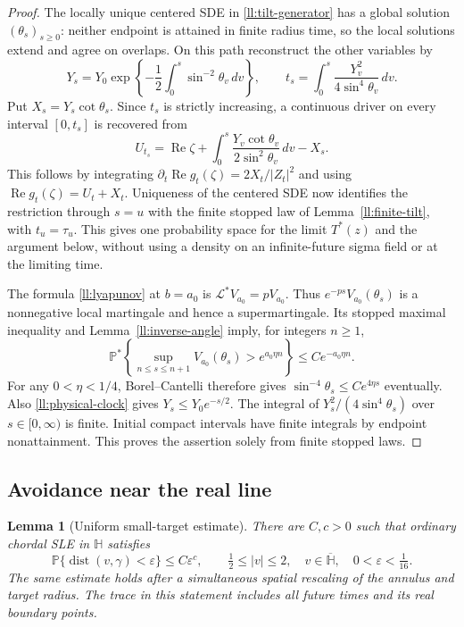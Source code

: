 \documentclass[11pt]{article}
\newtheorem{lemma}[theorem]{Lemma}
\theoremstyle{definition}
\theoremstyle{remark}
\numberwithin{equation}{section}
\begin{document}
\begin{proof}
The locally unique centered SDE in \eqref{ll:tilt-generator} has a global
solution $(\theta_s)_{s\ge0}$: neither endpoint is attained in finite
radius time, so the local solutions extend and agree on overlaps.
On this path reconstruct the other variables by
\[
 Y_s=Y_0\exp\left\{-\frac12\int_0^s\sin^{-2}\theta_v\,dv\right\},
 \qquad
 t_s=\int_0^s\frac{Y_v^2}{4\sin^4\theta_v}\,dv.
\]
Put $X_s=Y_s\cot\theta_s$.  Since $t_s$ is strictly increasing, a
continuous driver on every interval $[0,t_s]$ is recovered from
\[
 U_{t_s}=\operatorname{Re}\zeta+
       \int_0^s\frac{Y_v\cot\theta_v}{2\sin^2\theta_v}\,dv-X_s.
\]
This follows by integrating $\partial_t\operatorname{Re}g_t(\zeta)
=2X_t/|Z_t|^2$ and using $\operatorname{Re}g_t(\zeta)=U_t+X_t$.
Uniqueness of the centered SDE now identifies the restriction through
$s=u$ with the finite stopped law of Lemma~\ref{ll:finite-tilt}, with
$t_u=\tau_u$. This gives one probability space for the limit $T^*(z)$
and the argument below, without using a
density on an infinite-future sigma field or at the limiting time.

The formula \eqref{ll:lyapunov} at $b=a_0$ is
$\mathcal L^*V_{a_0}=pV_{a_0}$.
Thus $e^{-ps}V_{a_0}(\theta_s)$ is a nonnegative local martingale
and hence a supermartingale. Its stopped maximal inequality and
Lemma~\ref{ll:inverse-angle} imply, for integers $n\ge1$,
\[
 \mathbb P^*\left\{\sup_{n\le s\le n+1}
       V_{a_0}(\theta_s)>e^{a_0\eta n}\right\}
       \le C e^{-a_0\eta n}.
\]
For any $0<\eta<1/4$, Borel--Cantelli therefore gives
$\sin^{-4}\theta_s\le C e^{4\eta s}$ eventually.
Also \eqref{ll:physical-clock} gives $Y_s\le Y_0e^{-s/2}$.
The integral of $Y_s^2/(4\sin^4\theta_s)$ over $s\in[0,\infty)$
is finite. Initial compact intervals have finite integrals by
endpoint nonattainment. This proves the assertion solely from
finite stopped laws.
\end{proof}

\subsection{Avoidance near the real line}

\begin{lemma}[Uniform small-target estimate]\label{ll:near-real}
There are $C,c>0$ such that ordinary chordal SLE in $\mathbb H$
satisfies
\[
 \mathbb P\{\operatorname{dist}(v,\gamma)<\varepsilon\}
       \le C\varepsilon^c,
 \qquad \tfrac12\le|v|\le2,\quad
 v\in\overline{\mathbb H},\quad 0<\varepsilon<\tfrac1{16}.
\]
The same estimate holds after a simultaneous spatial rescaling of
the annulus and target radius. The trace in this statement includes
all future times and its real boundary points.
\end{lemma}
\end{document}
